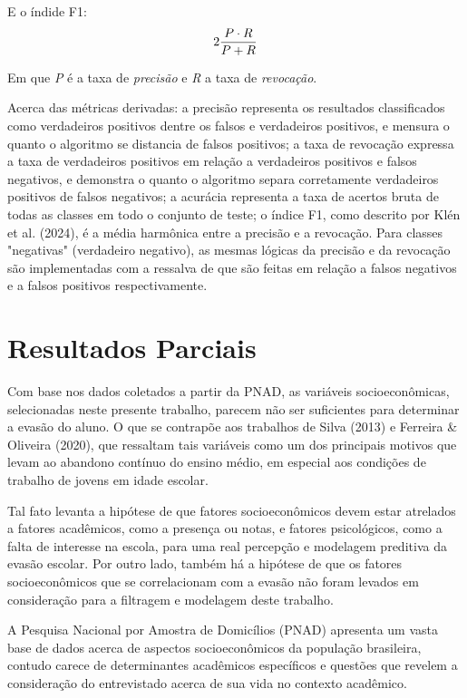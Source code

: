 \documentclass[english, spanish, brazilian]{RBIEarticle} %
\begin{document}
\vspace{0.5cm}
E o índide F1:
\begin{equation}
    \large 2 \frac{P \cdot R}{P+R}
\end{equation}
\vspace{0.5cm}

Em que \textit{P} é a taxa de \textit{precisão} e \textit{R} a taxa de \textit{revocação}.

Acerca das métricas derivadas: a precisão representa os resultados classificados como verdadeiros positivos dentre os falsos e verdadeiros positivos, e mensura o quanto o algoritmo se distancia de falsos positivos; a taxa de revocação expressa a taxa de verdadeiros positivos em relação a verdadeiros positivos e falsos negativos, e demonstra o quanto o algoritmo separa corretamente verdadeiros positivos de falsos negativos; a acurácia representa a taxa de acertos bruta de todas as classes em todo o conjunto de teste; o índice F1, como descrito por Klén et al. (2024), é a média harmônica entre a precisão e a revocação. Para classes "negativas" (verdadeiro negativo), as mesmas lógicas da precisão e da revocação são implementadas com a ressalva de que são feitas em relação a falsos negativos e a falsos positivos respectivamente. 

\section{Resultados Parciais}

Com base nos dados coletados a partir da PNAD, as variáveis socioeconômicas, selecionadas neste presente trabalho, parecem não ser suficientes para determinar a evasão do aluno. O que se contrapõe aos trabalhos de Silva (2013) e Ferreira \& Oliveira (2020), que ressaltam tais variáveis como um dos principais motivos que levam ao abandono contínuo do ensino médio, em especial aos condições de trabalho de jovens em idade escolar.

Tal fato levanta a hipótese de que fatores socioeconômicos devem estar atrelados a fatores acadêmicos, como a presença ou notas, e fatores psicológicos, como a falta de interesse na escola, para uma real percepção e modelagem preditiva da evasão escolar. Por outro lado, também há a hipótese de que os fatores socioeconômicos que se correlacionam com a evasão não foram levados em consideração para a filtragem e modelagem deste trabalho.

A Pesquisa Nacional por Amostra de Domicílios (PNAD) apresenta um vasta base de dados acerca de aspectos socioeconômicos da população brasileira, contudo carece de determinantes acadêmicos específicos e questões que revelem a consideração do entrevistado acerca de sua vida no contexto acadêmico. 
\end{document}
